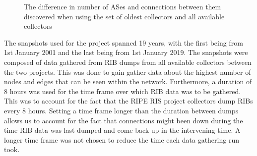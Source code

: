 \documentclass{mpaper}
\begin{document}
\begin{figure}
  \centering
  \hfill
  \hfill
  \caption{The difference in number of ASes and connections between them discovered when using the set of oldest collectors and all available collectors}
\end{figure}

The snapshots used for the project spanned 19 years, with the first being from 1st January 2001 and the last being from 1st January 2019. The snapshots were composed of data gathered from RIB dumps from all available collectors between the two projects. This was done to gain gather data about the highest number of nodes and edges that can be seen within the network. Furthermore, a duration of 8 hours was used for the time frame over which RIB data was to be gathered. This was to account for the fact that the RIPE RIS project collectors dump RIBs every 8 hours. Setting a time frame longer than the duration between dumps allows us to account for the fact that connections might been down during the time RIB data was last dumped and come back up in the intervening time. A longer time frame was not chosen to reduce the time each data gathering run took.
\end{document}

